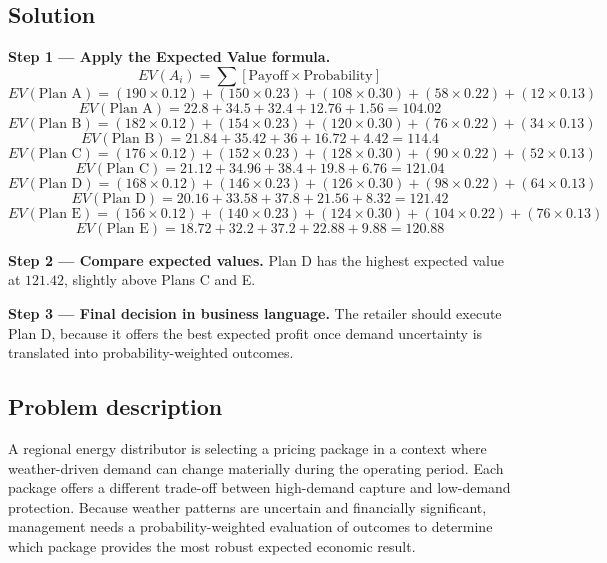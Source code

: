 \begin{ExamProblems}
		\subsection*{Solution}
		\textbf{Step 1 --- Apply the Expected Value formula.}
		\[
		EV(A_i)=\sum [\text{Payoff}\times\text{Probability}]
		\]
		\[
		EV(\text{Plan A})=(190\times0.12)+(150\times0.23)+(108\times0.30)+(58\times0.22)+(12\times0.13)
		\]
		\[
		EV(\text{Plan A})=22.8+34.5+32.4+12.76+1.56=104.02
		\]
		\[
		EV(\text{Plan B})=(182\times0.12)+(154\times0.23)+(120\times0.30)+(76\times0.22)+(34\times0.13)
		\]
		\[
		EV(\text{Plan B})=21.84+35.42+36+16.72+4.42=114.4
		\]
		\[
		EV(\text{Plan C})=(176\times0.12)+(152\times0.23)+(128\times0.30)+(90\times0.22)+(52\times0.13)
		\]
		\[
		EV(\text{Plan C})=21.12+34.96+38.4+19.8+6.76=121.04
		\]
		\[
		EV(\text{Plan D})=(168\times0.12)+(146\times0.23)+(126\times0.30)+(98\times0.22)+(64\times0.13)
		\]
		\[
		EV(\text{Plan D})=20.16+33.58+37.8+21.56+8.32=121.42
		\]
		\[
		EV(\text{Plan E})=(156\times0.12)+(140\times0.23)+(124\times0.30)+(104\times0.22)+(76\times0.13)
		\]
		\[
		EV(\text{Plan E})=18.72+32.2+37.2+22.88+9.88=120.88
		\]
		
		\textbf{Step 2 --- Compare expected values.}
		Plan D has the highest expected value at $121.42$, slightly above Plans C and E.
		
		\textbf{Step 3 --- Final decision in business language.}
		The retailer should execute Plan D, because it offers the best expected profit once demand uncertainty is translated into probability-weighted outcomes.
		
		\item
		\subsection*{Problem description}
		A regional energy distributor is selecting a pricing package in a context where weather-driven demand can change materially during the operating period. Each package offers a different trade-off between high-demand capture and low-demand protection. Because weather patterns are uncertain and financially significant, management needs a probability-weighted evaluation of outcomes to determine which package provides the most robust expected economic result.


\end{ExamProblems}
